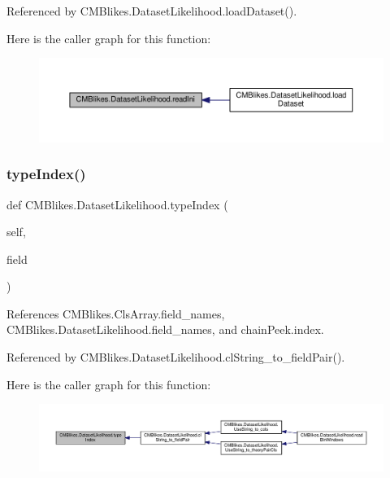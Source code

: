Referenced by C\+M\+Blikes.\+Dataset\+Likelihood.\+load\+Dataset().

Here is the caller graph for this function\+:
\nopagebreak
\begin{figure}[H]
\begin{center}
\leavevmode
\includegraphics[width=350pt]{classCMBlikes_1_1DatasetLikelihood_adb3126cf73eb96c8f6b877dc4a44e297_icgraph}
\end{center}
\end{figure}
\mbox{\label{classCMBlikes_1_1DatasetLikelihood_a219f6f7bb9eaa9b79491321f93714cc9}} 
\subsubsection{\texorpdfstring{type\+Index()}{typeIndex()}}
{\footnotesize\ttfamily def C\+M\+Blikes.\+Dataset\+Likelihood.\+type\+Index (\begin{DoxyParamCaption}\item[{}]{self,  }\item[{}]{field }\end{DoxyParamCaption})}



References C\+M\+Blikes.\+Cls\+Array.\+field\+\_\+names, C\+M\+Blikes.\+Dataset\+Likelihood.\+field\+\_\+names, and chain\+Peek.\+index.



Referenced by C\+M\+Blikes.\+Dataset\+Likelihood.\+cl\+String\+\_\+to\+\_\+field\+Pair().

Here is the caller graph for this function\+:
\nopagebreak
\begin{figure}[H]
\begin{center}
\leavevmode
\includegraphics[width=350pt]{classCMBlikes_1_1DatasetLikelihood_a219f6f7bb9eaa9b79491321f93714cc9_icgraph}
\end{center}
\end{figure}
\mbox{\label{classCMBlikes_1_1DatasetLikelihood_a5e9c351429d38145bb855c6cae9aa8a9}} 
